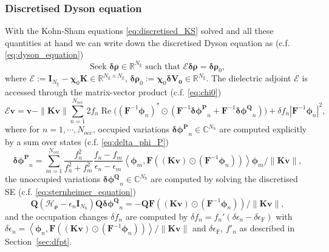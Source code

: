 \documentclass[hidelinks,onefignum,onetabnum]{siamart250211}
\newcommand{\R}{\mathbb{R}}
\newcommand{\C}{\mathbb{C}}
\newcommand{\Real}{\operatorname{Re}}
\newcommand{\Nocc}{N_{\mathrm{occ}}}
\newcommand{\epsilonF}{\epsilon_{\mathrm{F}}}
\newcommand{\Nb}{N_{\mathrm{b}}}
\newcommand{\Ng}{N_{\mathrm{g}}}
\newcommand{\braket}[2]{\left\langle #1, #2 \right\rangle}
\newcommand{\HrhoB}{\bm{\mathcal{H}}_{\bm \rho}}
\begin{document}
\subsubsection{Discretised Dyson equation}
With the Kohn-Sham equations \eqref{eq:discretised_KS} solved and all these quantities 
at hand we can write down the discretised Dyson equation as (c.f. \eqref{eq:dyson_equation})
\begin{equation}\label{eq:dyson_discretised}
  \text{Seek } \bm{\delta \rho} \in \R^{\Ng} \text{ such that } \bm{\mathcal E} \bm{\delta \rho} = \bm{\delta \rho}_0,
\end{equation}
where $\bm{\mathcal E} := \bm I_{\Ng} - \bm \chi_0 \bm K \in \R^{\Ng \times \Ng}$, $\bm{\delta \rho}_0 := \bm \chi_0 \bm{\delta V_0} \in \R^{\Ng}$. The dielectric adjoint $\bm{\mathcal E}$ is accessed through the matrix-vector product
(c.f. \eqref{eq:chi0})
\begin{equation}\label{eq:op_discretised}
    \bm{\mathcal E} \bm v =\bm v - \|\bm K \bm v\| \sum_{n=1}^{\Nocc} 2 f_n \Real \Big((\bm F^{-1} \bm{\phi}_n)^* \odot ( \bm F^{-1} \bm{\delta \phi^P}_n + \bm F^{-1} \bm{\delta \phi^Q}_n ) \Big) + \delta f_n \left| \bm F^{-1} \bm{\phi}_n \right|^2,
\end{equation}
where for $n=1,\cdots, \Nocc$, occupied variations $\bm{\delta \phi^P}_n \in \C^{\Nb}$ are computed explicitly by a sum over states (c.f. \eqref{eq:delta_phi_P})
\begin{equation}
    \label{eq:sumstateschi}
  \bm{\delta \phi^P}_n = \sum_{m=1}^{\Nocc} \frac{f_n^2}{f_n^2 + f_m^2} \frac{f_n - f_m}{\epsilon_n - \epsilon_m} \braket{\bm\phi_m}{\bm F \left( \left(\bm K \bm v\right) \odot \left( \bm F^{-1} \bm{\phi}_n \right) \right)} \bm\phi_m / \|\bm K \bm v\|,
\end{equation}
the unoccupied variations $\bm{\delta \phi^Q}_n \in \C^{\Nb}$ are computed by solving the discretised SE (c.f. \eqref{eq:sternheimer_equation})
\begin{equation}
    \label{eq:dicretized_sternheimer_equation}
  \bm Q \left(\HrhoB - \epsilon_n \bm I_{\Nb} \right) \bm Q \bm{\delta \phi^Q}_n = -\bm Q \bm F \left( \left(\bm K \bm v\right) \odot \left( \bm F^{-1} \bm{\phi}_n \right) \right)/\|\bm K \bm v\|,
\end{equation}
and the occupation changes $\delta f_n$ are computed by %
$\delta f_n = f_n' \left( \delta \epsilon_n - \delta \epsilonF \right)$
with $\delta \epsilon_n = \braket{\bm\phi_n}{\bm F \left( \left(\bm K \bm
v\right) \odot \left( \bm F^{-1} \bm{\phi}_n \right) \right)}/ \|\bm K \bm v\|$
and $\delta \epsilonF$, $f'_n$ as described in Section~\ref{sec:dfpt}.
%
\end{document}
